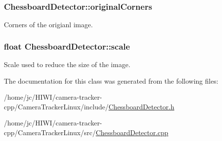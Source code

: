 \subsubsection[{\texorpdfstring{original\+Corners}{originalCorners}}]{ Chessboard\+Detector\+::original\+Corners\hspace{0.3cm}{\ttfamily [private]}}\hypertarget{class_chessboard_detector_a726c92a071aa8c46d67f33c7a0760d54}{}\label{class_chessboard_detector_a726c92a071aa8c46d67f33c7a0760d54}
Corners of the origianl image. 
\subsubsection[{\texorpdfstring{scale}{scale}}]{\setlength{\rightskip}{0pt plus 5cm}float Chessboard\+Detector\+::scale\hspace{0.3cm}{\ttfamily [private]}}\hypertarget{class_chessboard_detector_ac5594a662e5f276b5f0e5450b883efa0}{}\label{class_chessboard_detector_ac5594a662e5f276b5f0e5450b883efa0}
Scale used to reduce the size of the image. 

The documentation for this class was generated from the following files\+:\begin{DoxyCompactItemize}
\item 
/home/jc/\+H\+I\+W\+I/camera-\/tracker-\/cpp/\+Camera\+Tracker\+Linux/include/\hyperlink{_chessboard_detector_8h}{Chessboard\+Detector.\+h}\item 
/home/jc/\+H\+I\+W\+I/camera-\/tracker-\/cpp/\+Camera\+Tracker\+Linux/src/\hyperlink{_chessboard_detector_8cpp}{Chessboard\+Detector.\+cpp}\end{DoxyCompactItemize}
